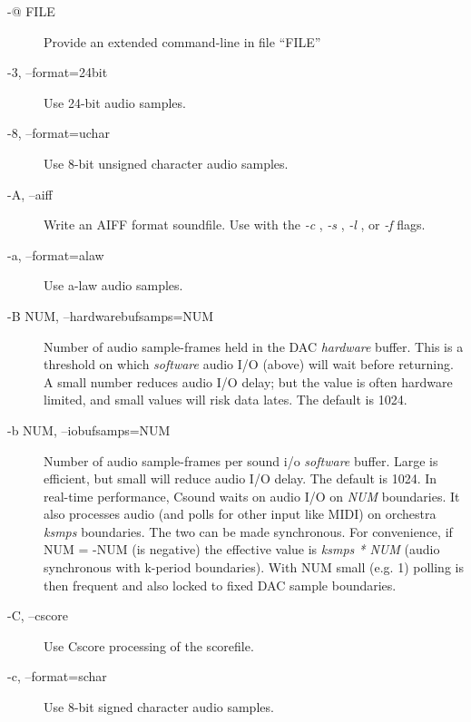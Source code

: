 \begin{description}
\item[-@ FILE]

  Provide an extended command-line in file ``FILE''

\item[-3, --format=24bit]

  Use 24-bit audio samples. 

\item[-8, --format=uchar]

  Use 8-bit unsigned character audio samples. 

\item[-A, --aiff]

  Write an AIFF format soundfile. Use with the \emph{-c}
, \emph{-s}
, \emph{-l}
, or \emph{-f}
 flags. 

\item[-a, --format=alaw]

  Use a-law audio samples. 

\item[-B NUM, --hardwarebufsamps=NUM]

  Number of audio sample-frames held in the DAC \emph{hardware}
 buffer. This is a threshold on which \emph{software}
 audio I/O (above) will wait before returning. A small number reduces audio I/O delay; but the value is often hardware limited, and small values will risk data lates. The default is 1024. 

\item[-b NUM, --iobufsamps=NUM]

  Number of audio sample-frames per sound i/o \emph{software}
 buffer. Large is efficient, but small will reduce audio I/O delay. The default is 1024. In real-time performance, Csound waits on audio I/O on \emph{NUM}
 boundaries. It also processes audio (and polls for other input like MIDI) on orchestra \emph{ksmps}
 boundaries. The two can be made synchronous. For convenience, if NUM = -NUM (is negative) the effective value is \emph{ksmps * NUM}
 (audio synchronous with k-period boundaries). With NUM small (e.g. 1) polling is then frequent and also locked to fixed DAC sample boundaries. 

\item[-C, --cscore]

  Use Cscore processing of the scorefile. 

\item[-c, --format=schar]

  Use 8-bit signed character audio samples. 


\end{description}
